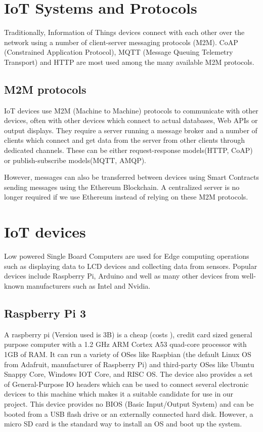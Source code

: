 \documentclass[11pt,openright]{report}
\begin{document}
\section{IoT Systems and Protocols}
Traditionally, Information of Things devices connect with each other over the network using a number of client-server messaging protocols (M2M). CoAP (Constrained Application Protocol), MQTT (Message Queuing Telemetry Transport) and HTTP are most used among the many available M2M protocols.

\subsection{M2M protocols}
IoT devices use M2M (Machine to Machine) protocols to communicate with other devices, often with other devices which connect to actual databases, Web APIs or output displays. They require a server running a message broker and a number of clients which connect and get data from the server from other clients through dedicated channels. These can be either request-response models(HTTP, CoAP) or publish-subscribe models(MQTT, AMQP).

However, messages can also be transferred between devices using Smart Contracts sending messages using the Ethereum Blockchain. A centralized server is no longer required if we use Ethereum instead of relying on these M2M protocols.

\section{IoT devices}
Low powered Single Board Computers are used for Edge computing operations such as displaying data to LCD devices and collecting data from sensors. Popular devices include Raspberry Pi, Arduino and well as many other devices from well-known manufacturers such as Intel and Nvidia.

\subsection{Raspberry Pi 3}
A raspberry pi (Version used is 3B) is a cheap (costs ), credit card sized general purpose computer with a 1.2 GHz ARM Cortex A53 quad-core processor with 1GB of RAM. It can run a variety of OSes like Raspbian (the default Linux OS from Adafruit, manufacturer of Raspberry Pi) and third-party OSes like Ubuntu Snappy Core, Windows IOT Core, and RISC OS. The device also provides a set of General-Purpose IO headers which can be used to connect several electronic devices to this machine which makes it a suitable candidate for use in our project. This device provides no BIOS (Basic Input/Output System) and can be booted from a USB flash drive or an externally connected hard disk. However, a micro SD card is the standard way to install an OS and boot up the system.  
\end{document}
